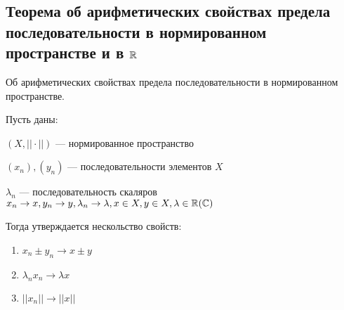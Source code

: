 \newpage
{}
\subsection{Теорема об арифметических свойствах предела последовательности в нормированном пространстве и в $\operatorname*{\mathbb{R}}$} %
  
\begin{theorem*}{Об арифметических свойствах предела последовательности в нормированном пространстве.} 

    Пусть даны:
  
    $(X, ||\cdot||)$ --- нормированное пространство
    
    $(x_n), (y_n)$ --- последовательности элементов $X$
    
    $\lambda_n$ --- последовательность скаляров    $x_n\rightarrow x, y_n\rightarrow y, \lambda_n\rightarrow \lambda, x \in X, y \in X, \lambda \in \operatorname*{\mathbb{R}}(\mathbb{C})$
    
    Тогда утверждается нескольство свойств:
    \begin{enumerate}
    \item $x_n \pm y_n \rightarrow x \pm y$
    \item $\lambda_n x_n \rightarrow \lambda x$
    \item $||x_n|| \rightarrow ||x||$
    \end{enumerate}
\end{theorem*}


